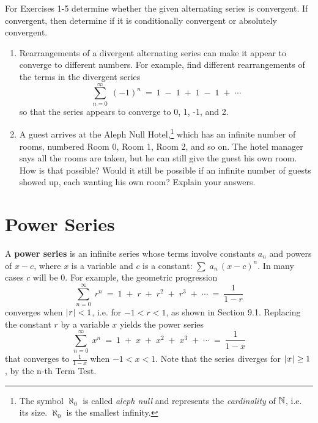 \divider
\vspace{2mm}
\startexercises\label{sec9dot3}
{\small
{}
\par\noindent For Exercises 1-5 determine whether the given alternating series is
convergent. If convergent, then determine if it is conditionally convergent or
absolutely convergent.
\begin{enumerate}[\bfseries 1.]
 \item Rearrangements of a divergent alternating series can make it appear to
 converge to different numbers. For example, find different rearrangements of
 the terms in the divergent series
\[
\sum_{n=0}^{\infty} \;(-1)^n ~=~ 1 \;-\; 1 \;+\; 1 \;-\; 1 \;+\; \cdots
\]
 so that the series appears to converge to 0, 1, -1, and 2.
 \item A guest arrives at the Aleph Null Hotel,\footnote{The symbol $\aleph_0$
 is called \emph{aleph null} and represents the \emph{cardinality} of
 $\mathbb{N}$, i.e. its size. $\aleph_0$ is the smallest infinity.} which has an
 infinite number of rooms, numbered Room 0, Room 1, Room 2, and so on. The hotel
 manager says all the rooms are taken, but he can still give the guest his own
 room. How is that possible? Would it still be possible if an infinite number of
 guests showed up, each wanting his own room? Explain your answers.
\end{enumerate}
}
\newpage
\section{Power Series}
A \textbf{power series} is an infinite series whose
terms involve constants $a_n$ and powers of $x-c$, where $x$ is a variable and
$c$ is a constant: $\sum\;a_n\,(x-c)^n$. In many cases $c$ will be 0. For
example, the geometric progression
\[
\sum_{n=0}^{\infty} \;r^n ~=~ 
1 \;+\; r \;+\; r^2 \;+\; r^3 \;+\; \cdots ~=~  \frac{1}{1-r}
\]
converges when $\lvert\mspace{1mu}r\mspace{1mu}\rvert < 1$, i.e. for $-1<r<1$, as shown in Section 9.1.
Replacing the constant $r$ by a variable $x$ yields the power series
\begin{equation}\label{eqn:1over1minusx}
\sum_{n=0}^{\infty} \;x^n ~=~ 
1 \;+\; x \;+\; x^2 \;+\; x^3 \;+\; \cdots ~=~  \frac{1}{1-x}
\end{equation}
that converges to $\frac{1}{1-x}$ when $-1<x<1$. Note that the series diverges
for $\lvert\mspace{1mu}x\mspace{1mu}\rvert\ge 1$, by the n-th Term Test.

